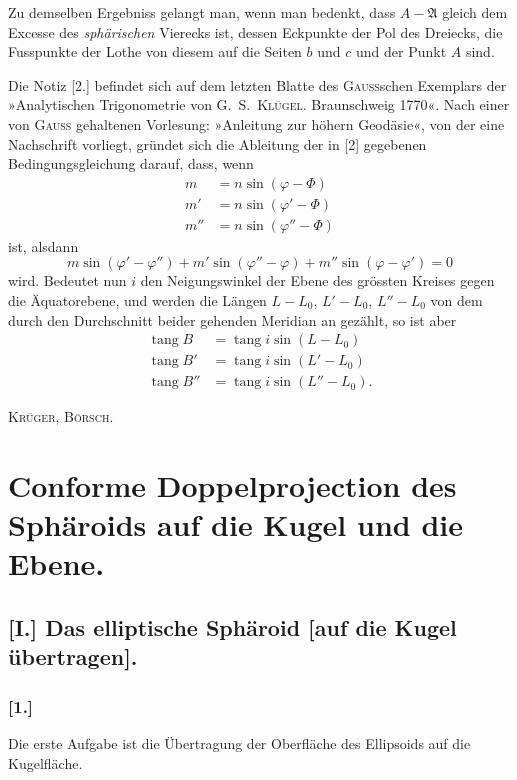 \documentclass[12pt,a4paper]{article}
\theoremstyle{plain}
\theoremstyle{definition}
\theoremstyle{remark}
\newcommand{\tang}{\operatorname{tang}}
\begin{document}
Zu demselben Ergebniss gelangt man, wenn man bedenkt, dass $A - \mathfrak{A}$ gleich dem Excesse des \textit{sphärischen}
Vierecks ist, dessen Eckpunkte der Pol des Dreiecks, die Fusspunkte der Lothe von diesem auf die Seiten
$b$ und $c$ und der Punkt $A$ sind.

Die Notiz [2.] befindet sich auf dem letzten Blatte des \textsc{Gauß}schen Exemplars der »Analytischen
Trigonometrie von G.~S.~\textsc{Klügel}. Braunschweig 1770«. Nach einer von \textsc{Gauss} gehaltenen Vorlesung:
»Anleitung zur höhern Geodäsie«, von der eine Nachschrift vorliegt, gründet sich die Ableitung der in [2]
gegebenen Bedingungsgleichung darauf, dass, wenn
\[
\begin{aligned}
m &= n\sin(\varphi - \Phi)\\
m' &= n\sin(\varphi' - \Phi)\\
m'' &= n\sin(\varphi'' - \Phi)
\end{aligned}
\]
ist, alsdann
\[
m\sin(\varphi' - \varphi'') + m'\sin(\varphi'' - \varphi) + m''\sin(\varphi - \varphi') = 0
\]
wird. Bedeutet nun $i$ den Neigungswinkel der Ebene des grössten Kreises gegen die Äquatorebene, und
werden die Längen $L - L_0$, $L' - L_0$, $L'' - L_0$ von dem durch den Durchschnitt beider gehenden Meridian
an gezählt, so ist aber
\[
\begin{aligned}
\tang B &= \tang i \sin(L - L_0)\\
\tang B' &= \tang i \sin(L' - L_0)\\
\tang B'' &= \tang i \sin(L'' - L_0).
\end{aligned}
\]

\hfill \textsc{Krüger, Börsch.}

\newpage
\section*{Conforme Doppelprojection des Sphäroids auf die Kugel und die Ebene.}

\newpage
\subsection*{[I.] Das elliptische Sphäroid [auf die Kugel übertragen].}

\subsubsection*{[1.]}
Die erste Aufgabe ist die Übertragung der Oberfläche des Ellipsoids auf
die Kugelfläche.
\end{document}
